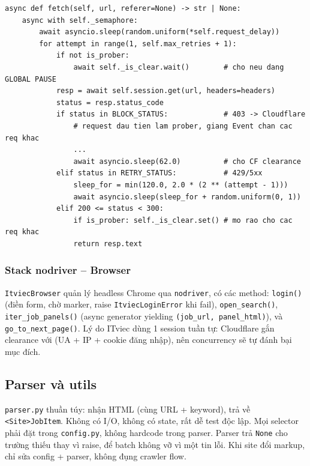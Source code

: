 \begin{lstlisting}[caption={Logic fetch() rút gọn (src/crawl\_layer/crawler/topcv/http\_client.py)},label={lst:fetch}]
async def fetch(self, url, referer=None) -> str | None:
    async with self._semaphore:
        await asyncio.sleep(random.uniform(*self.request_delay))
        for attempt in range(1, self.max_retries + 1):
            if not is_prober:
                await self._is_clear.wait()        # cho neu dang GLOBAL PAUSE
            resp = await self.session.get(url, headers=headers)
            status = resp.status_code
            if status in BLOCK_STATUS:             # 403 -> Cloudflare
                # request dau tien lam prober, giang Event chan cac req khac
                ...
                await asyncio.sleep(62.0)          # cho CF clearance
            elif status in RETRY_STATUS:           # 429/5xx
                sleep_for = min(120.0, 2.0 * (2 ** (attempt - 1)))
                await asyncio.sleep(sleep_for + random.uniform(0, 1))
            elif 200 <= status < 300:
                if is_prober: self._is_clear.set() # mo rao cho cac req khac
                return resp.text
\end{lstlisting}

\subsubsection{Stack nodriver -- Browser}
\label{subsec:nodriver}

\texttt{ItviecBrowser} quản lý headless Chrome qua \texttt{nodriver}, có các
method: \texttt{login()} (điền form, chờ marker, raise \texttt{ItviecLoginError}
khi fail), \texttt{open\_search()}, \texttt{iter\_job\_panels()} (async generator
yielding \texttt{(job\_url, panel\_html)}), và \texttt{go\_to\_next\_page()}.
Lý do ITviec dùng 1 session tuần tự: Cloudflare gắn clearance với
(UA + IP + cookie đăng nhập), nên concurrency sẽ tự đánh bại mục đích.


\subsection{Parser và utils}
\label{subsec:crawl-parser}

\texttt{parser.py} thuần túy: nhận HTML (cùng URL + keyword), trả về
\texttt{<Site>JobItem}. Không có I/O, không có state, rất dễ test độc lập.
Mọi selector phải đặt trong \texttt{config.py}, không hardcode trong parser.
Parser trả \texttt{None} cho trường thiếu thay vì raise, để batch không vỡ vì
một tin lỗi. Khi site đổi markup, chỉ sửa config + parser, không đụng crawler
flow.

